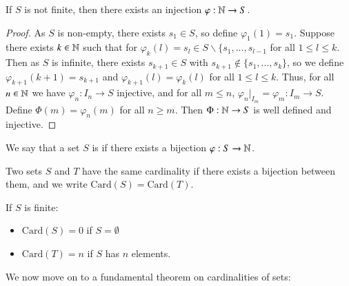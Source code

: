 \begin{subappendices}
    \begin{prop}\label{prop:1.8.7}
        If $S$ is not finite, then there exists an injection $\varphi:\mathbb N\rightarrow S$.
    \end{prop}
    \begin{proof}
        As $S$ is non-empty, there exists $s_1 \in S$, so define $\varphi_1(1) = s_1$. Suppose there exists $k \in \mathbb N$ such that for $\varphi_k(l) = s_l \in S\backslash\{s_1,...,s_{l-1}$ for all $1 \leq l \leq k$. Then as $S$ is infinite, there exists $s_{k+1} \in S$ with $s_{k+1} \notin \{s_1,...,s_k\}$, so we define $\varphi_{k+1}(k+1) = s_{k+1}$ and $\varphi_{k+1}(l) = \varphi_k(l)$ for all $1 \leq l \leq k$. Thus, for all $n \in \mathbb N$ we have $\varphi_n:I_n\rightarrow S$ injective, and for all $m \leq n$, $\varphi_n\vert_{I_m} = \varphi_m:I_m\rightarrow S$. Define $\Phi(m) = \varphi_n(m)$ for all $n \geq m$. Then $\Phi:\mathbb N\rightarrow S$ is well defined and injective.
    \end{proof}

    \begin{defn}
        We say that a set $S$ is  if there exists a bijection $\varphi:S\rightarrow \mathbb N$.
    \end{defn}

    \begin{defn}
        Two sets $S$ and $T$ have the same cardinality if there exists a bijection between them, and we write $\text{Card}(S) = \text{Card}(T)$.
    \end{defn}

    \begin{defn}
        If $S$ is finite: \begin{itemize}
            \item $\text{Card}(S) = 0$ if $S = \emptyset$
            \item $\text{Card}(T) = n$ if $S$ has $n$ elements.
        \end{itemize}
    \end{defn}

    We now move on to a fundamental theorem on cardinalities of sets:


\end{subappendices}
